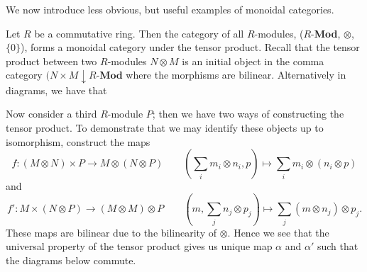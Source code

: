 We now introduce less obvious, but useful examples of monoidal categories.

\begin{example}
    Let $R$ be a commutative ring. Then the category of
    all $R$-modules, ($R$-\textbf{Mod}, $\otimes$, $\{0\}$), 
    forms a monoidal category under the tensor product. Recall that the 
    tensor product between two $R$-modules $N \otimes M$ is an initial object 
    in the comma category $(N \times M \downarrow R\textbf{-Mod}$ 
    where the morphisms are bilinear. Alternatively in diagrams, we have 
    that 
    \begin{center}
    \end{center}
    Now consider a third $R$-module $P$; then we have two ways of constructing 
    the tensor product. To demonstrate that we may identify these objects up 
    to isomorphism, construct the maps
    \[
        f: (M \otimes N)\times P \to M \otimes (N \otimes P)
        \qquad 
        \left(\sum_{i}m_i\otimes n_i, p\right)
        \mapsto 
        \sum_{i}m_i \otimes (n_i \otimes p)
    \]
    and 
    \[
        f': M \times (N \otimes P) \to (M \otimes M) \otimes P
        \qquad 
        \left(m, \sum_{j}n_j\otimes p_j  \right)
        \mapsto 
        \sum_{j}(m \otimes n_j) \otimes p_j.
    \]
    These maps are bilinear due to the bilinearity of $\otimes$. Hence we see 
    that the universal property of the tensor product gives us unique map $\alpha$ and 
    $\alpha'$ such that the diagrams below commute. 
    \begin{center}
\end{center}
\end{example}
